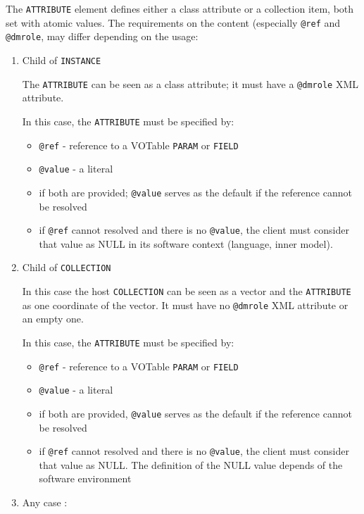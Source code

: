 
The \texttt{ATTRIBUTE} element defines either a class attribute or a collection item, both set with atomic values.
The requirements on
the content (especially \texttt{@ref} and  \texttt{@dmrole}, may differ depending on
the usage:


\begin{enumerate}
\item Child of \texttt{INSTANCE}

 The \texttt{ATTRIBUTE} can be seen as a class attribute;
    it must have a \texttt{@dmrole} XML attribute.

In this case, the \texttt{ATTRIBUTE} must be specified by:
  \begin{itemize} 
      \item \texttt{@ref} - reference to a VOTable \texttt{PARAM} or \texttt{FIELD}
      \item \texttt{@value} - a literal
      \item  if both are provided; \texttt{@value} serves as the default 
      if the reference cannot be resolved
      \item if \texttt{@ref} cannot resolved and there is no \texttt{@value}, the client must consider that value as NULL
            in its software context (language, inner model).
  \end{itemize}  

  
\item Child of \texttt{COLLECTION}

In this case the host \texttt{COLLECTION} can be seen as a vector and the \texttt{ATTRIBUTE} as one coordinate of the vector. 
It must have  no \texttt{@dmrole} XML attribute or an empty one.

In this case, the \texttt{ATTRIBUTE} must be specified by:
  \begin{itemize} 
      \item \texttt{@ref} - reference to a VOTable \texttt{PARAM} or \texttt{FIELD}
      \item \texttt{@value} - a literal
      \item if both are provided, \texttt{@value} serves as the default if 
      the reference cannot be resolved
      \item if \texttt{@ref} cannot resolved and there is no \texttt{@value}, the client must consider that value as NULL. 
            The definition of the NULL value depends of the software environment
  \end{itemize}  
              
\item Any case :


\end{enumerate}
